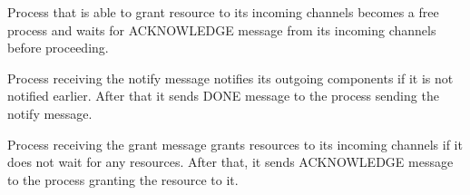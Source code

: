 \documentclass[letterpaper,10pt,english]{sphinxmanual}
\begin{document}
\begin{fulllineitems}
\begin{fulllineitems}
\end{fulllineitems}


\begin{fulllineitems}
\label{\detokenize{docs/BrachaToueg/generated/BrachaToueg.BrachaToueg:BrachaToueg.BrachaToueg.BrachaTouegComponentModel.grant}}
\pysigstartsignatures
{}
\pysigstopsignatures
\sphinxAtStartPar
Process that is able to grant resource to its incoming channels becomes a free process and
waits for ACKNOWLEDGE message from its incoming channels before proceeding.

\end{fulllineitems}


\begin{fulllineitems}
\label{\detokenize{docs/BrachaToueg/generated/BrachaToueg.BrachaToueg:BrachaToueg.BrachaToueg.BrachaTouegComponentModel.on_receiving_notify}}
\pysigstartsignatures
{}
\pysigstopsignatures
\sphinxAtStartPar
Process receiving the notify message notifies its outgoing components
if it is not notified earlier. After that it sends DONE message to the
process sending the notify message.

\end{fulllineitems}


\begin{fulllineitems}
\label{\detokenize{docs/BrachaToueg/generated/BrachaToueg.BrachaToueg:BrachaToueg.BrachaToueg.BrachaTouegComponentModel.on_receiving_grant}}
\pysigstartsignatures
{}
\pysigstopsignatures
\sphinxAtStartPar
Process receiving the grant message grants resources to its incoming channels
if it does not wait for any resources. After that, it sends ACKNOWLEDGE message
to the process granting the resource to it.


\end{fulllineitems}
\end{fulllineitems}
\end{document}

